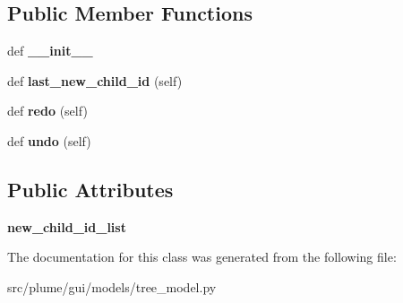\subsection*{Public Member Functions}
\begin{DoxyCompactItemize}
\item 
def {\bfseries \+\_\+\+\_\+init\+\_\+\+\_\+}\hypertarget{classplume-creator_1_1src_1_1plume_1_1gui_1_1models_1_1tree__model_1_1_add_child_node_command_a71a3a9beb5412e6050f9de546baff5a8}{}\label{classplume-creator_1_1src_1_1plume_1_1gui_1_1models_1_1tree__model_1_1_add_child_node_command_a71a3a9beb5412e6050f9de546baff5a8}

\item 
def {\bfseries last\+\_\+new\+\_\+child\+\_\+id} (self)\hypertarget{classplume-creator_1_1src_1_1plume_1_1gui_1_1models_1_1tree__model_1_1_add_child_node_command_a1f83d2dabb8d2d36391a5c0e92aed7e2}{}\label{classplume-creator_1_1src_1_1plume_1_1gui_1_1models_1_1tree__model_1_1_add_child_node_command_a1f83d2dabb8d2d36391a5c0e92aed7e2}

\item 
def {\bfseries redo} (self)\hypertarget{classplume-creator_1_1src_1_1plume_1_1gui_1_1models_1_1tree__model_1_1_add_child_node_command_aaf210300d42e55a2ed7319facdd219b5}{}\label{classplume-creator_1_1src_1_1plume_1_1gui_1_1models_1_1tree__model_1_1_add_child_node_command_aaf210300d42e55a2ed7319facdd219b5}

\item 
def {\bfseries undo} (self)\hypertarget{classplume-creator_1_1src_1_1plume_1_1gui_1_1models_1_1tree__model_1_1_add_child_node_command_aa6e2637238dc17f02b7cb71690ae092d}{}\label{classplume-creator_1_1src_1_1plume_1_1gui_1_1models_1_1tree__model_1_1_add_child_node_command_aa6e2637238dc17f02b7cb71690ae092d}

\end{DoxyCompactItemize}
\subsection*{Public Attributes}
\begin{DoxyCompactItemize}
\item 
{\bfseries new\+\_\+child\+\_\+id\+\_\+list}\hypertarget{classplume-creator_1_1src_1_1plume_1_1gui_1_1models_1_1tree__model_1_1_add_child_node_command_a74fccc5c07ed603926baeead64e5df6e}{}\label{classplume-creator_1_1src_1_1plume_1_1gui_1_1models_1_1tree__model_1_1_add_child_node_command_a74fccc5c07ed603926baeead64e5df6e}

\end{DoxyCompactItemize}


The documentation for this class was generated from the following file\+:\begin{DoxyCompactItemize}
\item 
src/plume/gui/models/tree\+\_\+model.\+py\end{DoxyCompactItemize}

